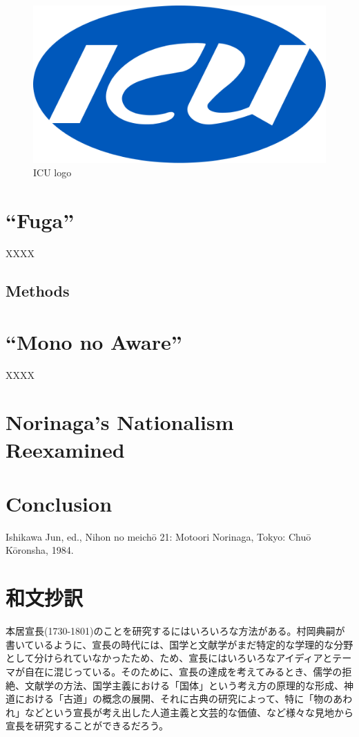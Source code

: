 \documentclass[12pt]{report}
\begin{document}
\begin{figure}[H]
    \begin{center}
    \includegraphics[width=\textwidth]{../figures/ICU_japan.png}
    \end{center}
    \caption{ICU logo}
    \label{1.1}
\end{figure}

\chapter{“Fuga”}
XXXX
\section{Methods}


\chapter{“Mono no Aware”}
XXXX

\chapter{Norinaga’s Nationalism Reexamined}

\chapter{Conclusion}
\begin{thebibliography}{99}


Ishikawa Jun, ed., Nihon no meichō 21: Motoori Norinaga, Tokyo: Chuō Kōronsha, 1984.
\end{thebibliography}
\chapter*{和文抄訳}
本居宣長(1730-1801)のことを研究するにはいろいろな方法がある。村岡典嗣が書いているように、宣長の時代には、国学と文献学がまだ特定的な学理的な分野として分けられていなかったため、ため、宣長にはいろいろなアイディアとテーマが自在に混じっている。そのために、宣長の達成を考えてみるとき、儒学の拒絶、文献学の方法、国学主義における「国体」という考え方の原理的な形成、神道における「古道」の概念の展開、それに古典の研究によって、特に「物のあわれ」などという宣長が考え出した人道主義と文芸的な価値、など様々な見地から宣長を研究することができるだろう。
\end{document}
